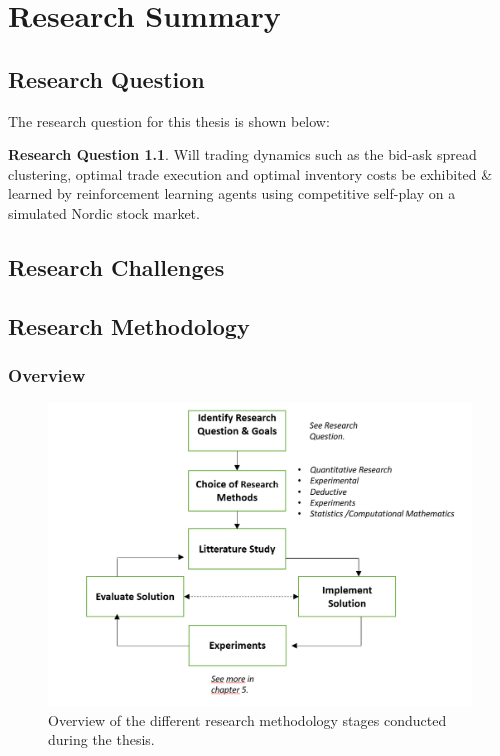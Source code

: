 \documentclass{kththesis}
\theoremstyle{definition}
\newtheorem{RQ}{Research Question}[section]
\begin{document}
\chapter{Research Summary}

\section{Research Question}
The research question for this thesis is shown below:

\begin{RQ}
Will trading dynamics such as the bid-ask spread clustering, optimal trade execution and optimal inventory costs be exhibited \& learned by reinforcement learning agents using competitive self-play on a simulated Nordic stock market.
\end{RQ}

\section{Research Challenges}

\section{Research Methodology}

\subsection{Overview}
\begin{figure}[H]
    \centering
    \includegraphics[scale=1]{Imgs/researchmethodsv2.PNG}
    \caption{Overview of the different research methodology stages conducted during the thesis.}
    \label{fig:r1}
\end{figure}
\end{document}
